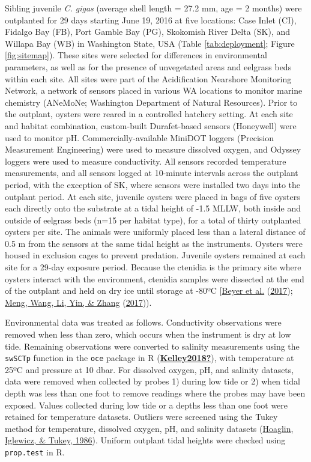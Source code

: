 \documentclass [11pt, proquest] {uwthesis}[2015/03/03]
\begin{document}
Sibling juvenile \emph{C. gigas} (average shell length = 27.2 mm, age = 2 months) were outplanted for 29 days starting June 19, 2016 at five locations: Case Inlet (CI), Fidalgo Bay (FB), Port Gamble Bay (PG), Skokomish River Delta (SK), and Willapa Bay (WB) in Washington State, USA (Table \ref{tab:deployment}; Figure \ref{fig:sitemap}). These sites were selected for differences in environmental parameters, as well as for the presence of unvegetated areas and eelgrass beds within each site. All sites were part of the Acidification Nearshore Monitoring Network, a network of sensors placed in various WA locations to monitor marine chemistry (ANeMoNe; Washington Department of Natural Resources). Prior to the outplant, oysters were reared in a controlled hatchery setting. At each site and habitat combination, custom-built Durafet-based sensors (Honeywell) were used to monitor pH. Commercially-available MiniDOT loggers (Precision Measurement Engineering) were used to measure dissolved oxygen, and Odyssey loggers were used to measure conductivity. All sensors recorded temperature measurements, and all sensors logged at 10-minute intervals across the outplant period, with the exception of SK, where sensors were installed two days into the outplant period. At each site, juvenile oysters were placed in bags of five oysters each directly onto the substrate at a tidal height of -1.5 MLLW, both inside and outside of eelgrass beds (n=15 per habitat type), for a total of thirty outplanted oysters per site. The animals were uniformly placed less than a lateral distance of 0.5 m from the sensors at the same tidal height as the instruments. Oysters were housed in exclusion cages to prevent predation. Juvenile oysters remained at each site for a 29-day exposure period. Because the ctenidia is the primary site where oysters interact with the environment, ctenidia samples were dissected at the end of the outplant and held on dry ice until storage at -80ºC {[}\protect\hyperlink{ref-Beyer2017}{Beyer et al.} (\protect\hyperlink{ref-Beyer2017}{2017}); \protect\hyperlink{ref-Meng2017}{Meng, Wang, Li, Yin, \& Zhang} (\protect\hyperlink{ref-Meng2017}{2017})).

Environmental data was treated as follows. Conductivity observations were removed when less than zero, which occurs when the instrument is dry at low tide. Remaining observations were converted to salinity measurements using the \texttt{swSCTp} function in the \texttt{oce} package in R (\protect\hyperlink{ref-Kelley2018}{\textbf{Kelley2018?}}), with temperature at 25ºC and pressure at 10 dbar. For dissolved oxygen, pH, and salinity datasets, data were removed when collected by probes 1) during low tide or 2) when tidal depth was less than one foot to remove readings where the probes may have been exposed. Values collected during low tide or a depths less than one foot were retained for temperature datasets. Outliers were screened using the Tukey method for temperature, dissolved oxygen, pH, and salinity datasets (\protect\hyperlink{ref-Hoaglin1986}{Hoaglin, Iglewicz, \& Tukey, 1986}). Uniform outplant tidal heights were checked using \texttt{prop.test} in R.
\end{document}
